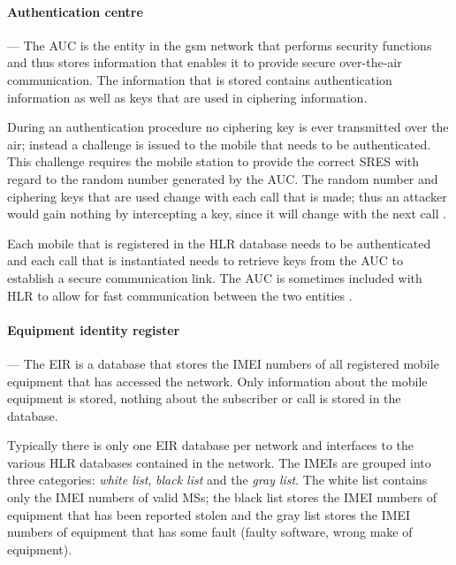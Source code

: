 \paragraph{Authentication centre}
--- The AUC is the entity in the \gls{gsm} network that performs security functions and thus stores information that enables it to provide secure over-the-air communication\cite{GSM92,GSMSysEngin}. The information that is stored contains authentication information as well as keys that are used in ciphering information\cite{GSM92,GSMSysEngin}.

During an authentication procedure no ciphering key is ever transmitted over the air; instead a challenge is issued to the mobile that needs to be authenticated. This challenge requires the mobile station to provide the correct \gls{SRES} with regard to the random number generated by the \gls{AUC}\cite{GSM92,GSMSysEngin}. The random number and ciphering keys that are used change with each call that is made; thus an attacker would gain nothing by intercepting a key, since it will change with the next call \cite{GSMSysEngin}.

Each mobile that is registered in the \gls{HLR} database needs to be authenticated and each call that is instantiated needs to retrieve keys from the AUC to establish a secure communication link\cite{GSM92,GSMSysEngin}. The AUC is sometimes included with \gls{HLR} to allow for fast communication between the two entities \cite{GSMSysEngin}.

\paragraph{Equipment identity register}
--- The \gls{EIR} is a database that stores the \gls{IMEI} numbers of all registered mobile equipment that has accessed the network. Only information about the mobile equipment is stored, nothing about the subscriber or call is stored in the database.

Typically there is only one \gls{EIR} database per network and interfaces to the various \gls{HLR} databases contained in the network. The \glspl{IMEI} are grouped into three categories: \emph{white list}, \emph{black list} and the \emph{gray list}. The white list contains only the \gls{IMEI} numbers of valid \glspl{MS}; the black list stores the \gls{IMEI} numbers of equipment that has been reported stolen and the gray list stores the \gls{IMEI} numbers of equipment that has some fault (faulty software, wrong make of equipment).

